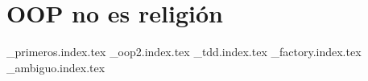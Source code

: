 \part{OOP no es religión}
  {_primeros.index.tex}
  {_oop2.index.tex}
  {_tdd.index.tex}
  {_factory.index.tex}
  {_ambiguo.index.tex}
